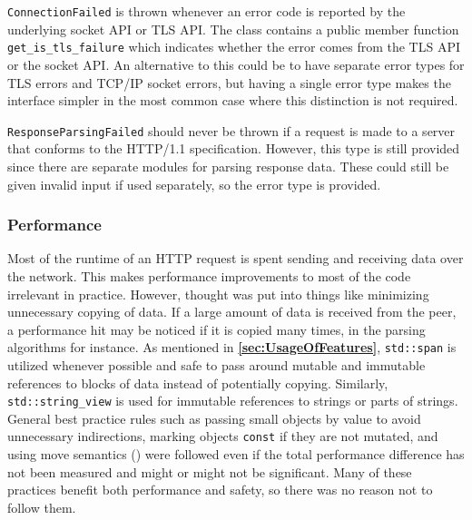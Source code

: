 \documentclass[12pt, a4paper]{article}
\begin{document}
\texttt{ConnectionFailed} is thrown whenever an error code is reported by the underlying socket API or TLS API. The class contains a public member function \texttt{get\_is\_tls\_failure} which indicates whether the error comes from the TLS API or the socket API. An alternative to this could be to have separate error types for TLS errors and TCP/IP socket errors, but having a single error type makes the interface simpler in the most common case where this distinction is not required. 

\texttt{ResponseParsingFailed} should never be thrown if a request is made to a server that conforms to the HTTP/1.1 specification. However, this type is still provided since there are separate modules for parsing response data. These could still be given invalid input if used separately, so the error type is provided.

\subsubsection{Performance}
Most of the runtime of an HTTP request is spent sending and receiving data over the network. This makes performance improvements to most of the code irrelevant in practice. However, thought was put into things like minimizing unnecessary copying of data. If a large amount of data is received from the peer, a performance hit may be noticed if it is copied many times, in the parsing algorithms for instance. As mentioned in \textbf{\ref{sec:UsageOfFeatures}}, \texttt{std::span} is utilized whenever possible and safe to pass around mutable and immutable references to blocks of data instead of potentially copying. Similarly, \texttt{std::string\_view} is used for immutable references to strings or parts of strings. General best practice rules such as passing small objects by value to avoid unnecessary indirections, marking objects \texttt{const} if they are not mutated, and using move semantics (\cite{CppCoreGuidelines}) were followed even if the total performance difference has not been measured and might or might not be significant. Many of these practices benefit both performance and safety, so there was no reason not to follow them.
\end{document}

